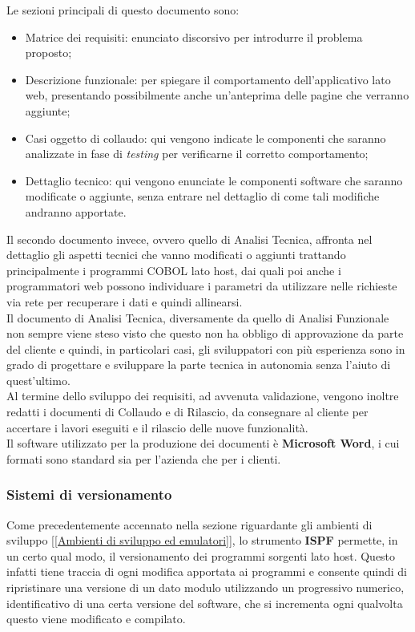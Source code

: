 	Le sezioni principali di questo documento sono:
\begin{itemize}
	\item Matrice dei requisiti: enunciato discorsivo per introdurre il problema proposto;
	\item Descrizione funzionale: per spiegare il comportamento dell'applicativo lato web, presentando possibilmente anche un'anteprima delle pagine che verranno aggiunte;
	\item Casi oggetto di collaudo: qui vengono indicate le componenti che saranno analizzate in fase di  \textit{testing} per verificarne il corretto comportamento;
	\item Dettaglio tecnico: qui vengono enunciate le componenti software che saranno modificate o aggiunte, senza entrare nel dettaglio di come tali modifiche andranno apportate.
\end{itemize}

	Il secondo documento invece, ovvero quello di Analisi Tecnica, affronta nel dettaglio gli aspetti tecnici che vanno modificati o aggiunti trattando principalmente i programmi COBOL lato host, dai quali poi anche i programmatori web possono individuare i parametri da utilizzare nelle richieste via rete per recuperare i dati e quindi allinearsi.\\
	
	Il documento di Analisi Tecnica, diversamente da quello di Analisi Funzionale non sempre viene steso visto che questo non ha obbligo di approvazione da parte del cliente e quindi, in particolari casi, gli sviluppatori con più esperienza sono in grado di progettare e sviluppare la parte tecnica in autonomia senza l'aiuto di quest'ultimo.\\
	
	Al termine dello sviluppo dei requisiti, ad avvenuta validazione, vengono inoltre redatti i documenti di Collaudo e di Rilascio, da consegnare al cliente per accertare i lavori eseguiti e il rilascio delle nuove funzionalità.\\
			
	Il software utilizzato per la produzione dei documenti è \textbf{Microsoft Word}, i cui formati sono standard sia per l'azienda che per i clienti.
	
	
	\subsubsection{Sistemi di versionamento}

	Come precedentemente accennato nella sezione riguardante gli ambienti di sviluppo [\ref{Ambienti di sviluppo ed emulatori}], lo strumento \textbf{ISPF} permette, in un certo qual modo, il versionamento dei programmi sorgenti lato host. Questo infatti tiene traccia di ogni modifica apportata ai programmi e consente quindi di ripristinare una versione di un dato modulo utilizzando un progressivo numerico, identificativo di una certa versione del software, che si incrementa ogni qualvolta questo viene modificato e compilato.\\
	
